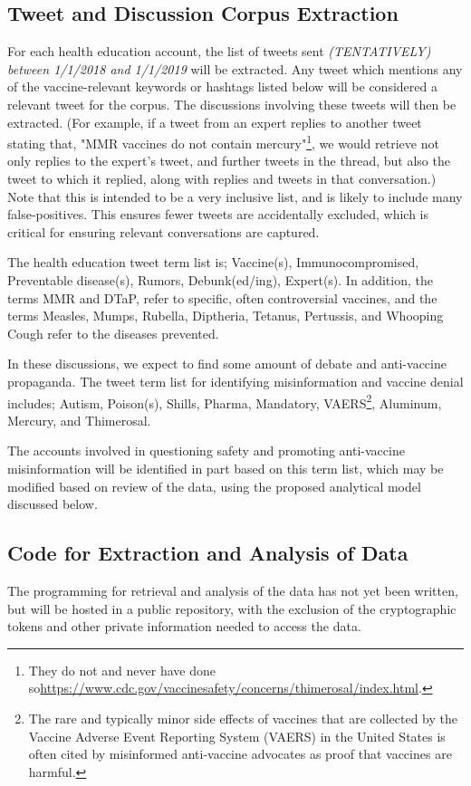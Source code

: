 \documentclass{article}
\begin{document}
\subsection{Tweet and Discussion Corpus Extraction}

For each health education account, the list of tweets sent \textit{(TENTATIVELY) between 1/1/2018 and 1/1/2019} will be extracted. Any tweet which mentions any of the vaccine-relevant keywords or hashtags listed below will be considered a relevant tweet for the corpus. The discussions involving these tweets will then be extracted. (For example, if a tweet from an expert replies to another tweet stating that, "MMR vaccines do not contain mercury"\footnote{They do not and never have done so\url{https://www.cdc.gov/vaccinesafety/concerns/thimerosal/index.html}.}, we would retrieve not only replies to the expert's tweet, and further tweets in the thread, but also the tweet to which it replied, along with replies and tweets in that conversation.) Note that this is intended to be a very inclusive list, and is likely to include many false-positives. This ensures fewer tweets are accidentally excluded, which is critical for ensuring relevant conversations are captured.

The health education tweet term list is; Vaccine(s), Immunocompromised, Preventable disease(s), Rumors, Debunk(ed/ing), Expert(s). In addition, the terms MMR and DTaP, refer to specific, often controversial vaccines, and the terms Measles, Mumps, Rubella, Diptheria, Tetanus, Pertussis, and Whooping Cough refer to the diseases prevented.

In these discussions, we expect to find some amount of debate and anti-vaccine propaganda. The tweet term list for identifying misinformation and vaccine denial includes; Autism, Poison(s), Shills, Pharma, Mandatory, VAERS\footnote{The rare and typically minor side effects of vaccines that are collected by the Vaccine Adverse Event Reporting System (VAERS) in the United States is often cited by misinformed anti-vaccine advocates as proof that vaccines are harmful.}, Aluminum, Mercury, and Thimerosal.

The accounts involved in questioning safety and promoting anti-vaccine misinformation will be identified in part based on this term list, which may be modified based on review of the data, using the proposed analytical model discussed below.

\subsection{Code for Extraction and Analysis of Data}
The programming for retrieval and analysis of the data has not yet been written, but will be hosted in a public repository, with the exclusion of the cryptographic tokens and other private information needed to access the data.
\end{document}
